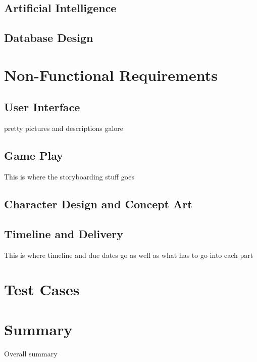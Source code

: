 \documentclass[12pt]{IEEEtran}
\begin{document}
\subsection{Artificial Intelligence}
\label{subsec:ai}



\subsection{Database Design}
\label{subsec:dbdesign}

\section{Non-Functional Requirements}
\label{sec:nonFuncReq}

\subsection{User Interface}
\label{subsec:ui}

pretty pictures and descriptions galore

\subsection{Game Play}
\label{subsec:gameplay}

	This is where the storyboarding stuff goes

\subsection{Character Design and Concept Art}
\label{subsec:cdesign}

\subsection{Timeline and Delivery}
\label{subsec:timeline}

	This is where timeline and due dates go as well as what has to go into each part

\section{Test Cases}
\label{sec:test}

\section{Summary}
\label{sec:summary}

	Overall summary
\end{document}
